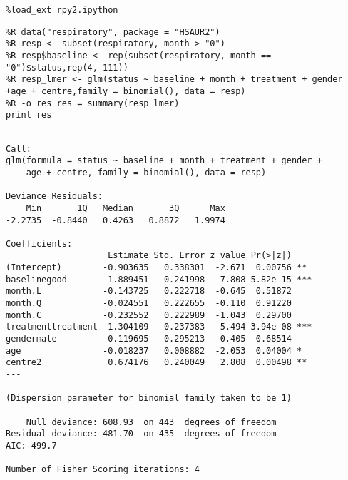 \documentclass[12pt,fleqn]{article}\usepackage{../common}
\begin{document}
\begin{verbatim}
%load_ext rpy2.ipython
\end{verbatim}

\begin{verbatim}
%R data("respiratory", package = "HSAUR2")
%R resp <- subset(respiratory, month > "0")
%R resp$baseline <- rep(subset(respiratory, month == "0")$status,rep(4, 111))
%R resp_lmer <- glm(status ~ baseline + month + treatment + gender +age + centre,family = binomial(), data = resp)
%R -o res res = summary(resp_lmer)
print res
\end{verbatim}

\begin{verbatim}

Call:
glm(formula = status ~ baseline + month + treatment + gender + 
    age + centre, family = binomial(), data = resp)

Deviance Residuals: 
    Min       1Q   Median       3Q      Max  
-2.2735  -0.8440   0.4263   0.8872   1.9974  

Coefficients:
                    Estimate Std. Error z value Pr(>|z|)    
(Intercept)        -0.903635   0.338301  -2.671  0.00756 ** 
baselinegood        1.889451   0.241998   7.808 5.82e-15 ***
month.L            -0.143725   0.222718  -0.645  0.51872    
month.Q            -0.024551   0.222655  -0.110  0.91220    
month.C            -0.232552   0.222989  -1.043  0.29700    
treatmenttreatment  1.304109   0.237383   5.494 3.94e-08 ***
gendermale          0.119695   0.295213   0.405  0.68514    
age                -0.018237   0.008882  -2.053  0.04004 *  
centre2             0.674176   0.240049   2.808  0.00498 ** 
---

(Dispersion parameter for binomial family taken to be 1)

    Null deviance: 608.93  on 443  degrees of freedom
Residual deviance: 481.70  on 435  degrees of freedom
AIC: 499.7

Number of Fisher Scoring iterations: 4


\end{verbatim}
\end{document}
